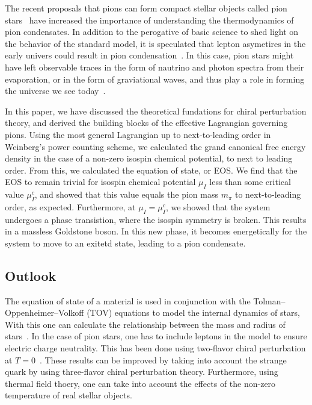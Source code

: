The recent proposals that pions can form compact stellar objects called pion stars~\cite{new_clas_of_compact_stars,andersen:bose_einstein} have increased the importance of understanding the thermodynamics of pion condensates.
In addition to the perogative of basic science to shed light on the behavior of the standard model, it is speculated that lepton asymetires in the early univers could result in pion condensation~\cite{new_clas_of_compact_stars,abduki:Pion_condensation_in_a_dense_neutrino_gas,Wygas:Cosmic_QCD_Epoch_at_Nonvanishing_Lepton_Asymmetry,Schwarz_2009:Lepton_asymmetry_and_the_cosmic_QCD_transition}.
In this case, pion stars might have left observable traces in the form of nautrino and photon spectra from their evaporation, or in the form of graviational waves, and thus play a role in forming the universe we see today~\cite{new_clas_of_compact_stars}.

In this paper, we have discussed the theoretical fundations for chiral perturbation theory, and derived the building blocks of the effective Lagrangian governing pions.
Using the most general Lagrangian up to next-to-leading order in Weinberg's power counting scheme, we calculated the grand canonical free energy density in the case of a non-zero isospin chemical potential, to next to leading order.
From this, we calculated the equation of state, or EOS.
We find that the EOS to remain trivial for isospin chemical potential $\mu_I$ less than some critical value $\mu_I^c$, and showed that this value equals the pion mass $m_\pi$ to next-to-leading order, as expected.
Furthermore, at $\mu_I = \mu_I^c$, we showed that the system undergoes a phase transistion, where the isospin symmetry is broken.
This results in a massless Goldstone boson.
In this new phase, it becomes energetically for the system to move to an exitetd state, leading to a pion condensate.

\subsection*{Outlook}

The equation of state of a material is used in conjunction with the Tolman–Oppenheimer–Volkoff (TOV) equations to model the internal dynamics of stars,
With this one can calculate the relationship between the mass and radius of stars~\cite{Carroll:spacetime}.
In the case of pion stars, one has to include leptons in the model to ensure electric charge neutrality.
This has been done using two-flavor chiral perturbation at $T=0$~\cite{Andersen:two-flavor-chpt,andersen:bose_einstein}.
These results can be improved by taking into account the strange quark by using three-flavor chiral perturbation theory.
Furthermore, using thermal field thoery, one can take into account the effects of the non-zero temperature of real stellar objects.

